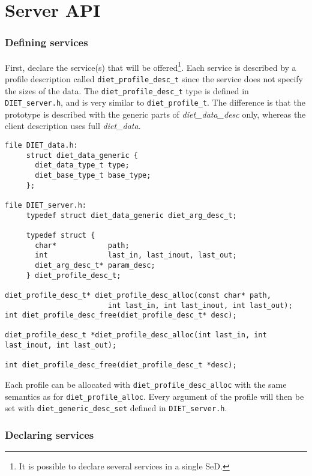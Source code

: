 \section{Server API}
\label{sec:svAPI}


\subsubsection*{Defining services}

First, declare the service(s) that will be offered{\footnote{It is
possible to declare several services in a single SeD.}}.
Each service is described by a profile description called
\texttt{diet\_profile\_desc\_t} since the service does not specify
the sizes of the data. The \texttt{diet\_profile\_desc\_t} type is
defined in \texttt{DIET\_server.h}, and is very similar to
\texttt{diet\_profile\_t}. The difference is that the prototype is
described with the generic parts of \emph{diet\_data\_desc} only,
whereas the client description uses full \emph{diet\_data}.
{\footnotesize
\begin{verbatim}
file DIET_data.h:
     struct diet_data_generic {
       diet_data_type_t type;
       diet_base_type_t base_type;
     };

file DIET_server.h:
     typedef struct diet_data_generic diet_arg_desc_t;

     typedef struct {
       char*            path;
       int              last_in, last_inout, last_out;
       diet_arg_desc_t* param_desc;
     } diet_profile_desc_t;

diet_profile_desc_t* diet_profile_desc_alloc(const char* path,
                        int last_in, int last_inout, int last_out);
int diet_profile_desc_free(diet_profile_desc_t* desc);

diet_profile_desc_t *diet_profile_desc_alloc(int last_in, int last_inout, int last_out);

int diet_profile_desc_free(diet_profile_desc_t *desc);
\end{verbatim}
}

Each profile can be allocated with \texttt{diet\_profile\_desc\_alloc} with the
same semantics as for \texttt{diet\_profile\_alloc}. Every argument of the
profile will then be set with \texttt{diet\_generic\_desc\_set} defined in
\texttt{DIET\_server.h}.

\subsubsection*{Declaring services}

